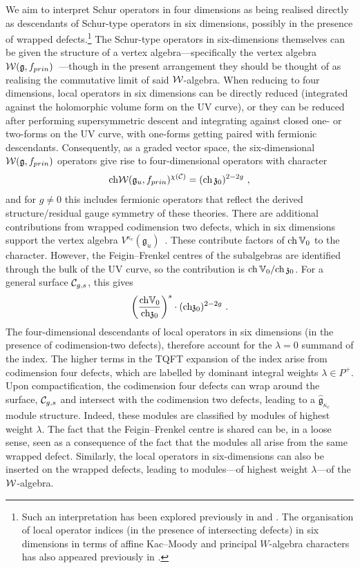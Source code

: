 \documentclass[a4paper]{article}
\def\IV{\mathbb{V}}
\def\CC{{\cal C}}
\def\WW{{\cal W}}
\def\ch{{\rm ch}}
\def\gf{\mathfrak{g}}
\def \zf{\mathfrak{z}}
\begin{document}
We aim to interpret Schur operators in four dimensions as being realised directly as descendants of Schur-type operators in six dimensions, possibly in the presence of wrapped defects.\footnote{Such an interpretation has been explored previously in \cite{gaioul} and \cite{BRZ}. The organisation of local operator indices (in the presence of intersecting defects) in six dimensions in terms of affine Kac--Moody and principal $W$-algebra characters has also appeared previously in \cite{Bullimore:2014upa}.} The Schur-type operators in six-dimensions themselves can be given the structure of a vertex algebra---specifically the vertex algebra $\WW(\gf,f_{prin})$~\cite{Beem:2014kka}---though in the present arrangement they should be thought of as realising the commutative limit of said $\WW$-algebra. When reducing to four dimensions, local operators in six dimensions can be directly reduced (integrated against the holomorphic volume form on the UV curve), or they can be reduced after performing supersymmetric descent and integrating against closed one- or two-forms on the UV curve, with one-forms getting paired with fermionic descendants. Consequently, as a graded vector space, the six-dimensional $\WW(\gf, f_{prin})$ operators give rise to four-dimensional operators with character
\begin{equation}
	\ch\WW(\gf_u,f_{prin})^{\chi(\CC)} = (\ch\, \zf_0)^{2-2g}~,
\end{equation}
and for $g\neq0$ this includes fermionic operators that reflect the derived structure/residual gauge symmetry of these theories. There are additional contributions from wrapped codimension two defects, which in six dimensions support the vertex algebra $V^{\kappa_c}(\gf_u)$~\cite{Beem:2014kka}. These contribute factors of $\ch\, \IV_0$ to the character. However, the Feigin--Frenkel centres of the subalgebras are identified through the bulk of the UV curve, so the contribution is $\ch\, \IV_0/\ch\,\zf_0$. For a general surface $\CC_{g,s}$, this gives
\begin{equation}
	 \left(\frac{\ch \IV_0}{\ch \zf_0}\right)^{s}\cdot (\ch \zf_0)^{2-2g}~.
\end{equation}
The four-dimensional descendants of local operators in six dimensions (in the presence of codimension-two defects), therefore account for the $\lambda=0$ summand of the index. The higher terms in the TQFT expansion of the index arise from codimension four defects, which are labelled by dominant integral weights $\lambda\in P^+$. Upon compactification, the codimension four defects can wrap around the surface, $\CC_{g,s}$ and intersect with the codimension two defects, leading to a $\hat{\gf}_{\kappa_c}$ module structure. Indeed, these modules are classified by modules of highest weight $\lambda$. The fact that the Feigin--Frenkel centre is shared can be, in a loose sense, seen as a consequence of the fact that the modules all arise from the same wrapped defect. Similarly, the local operators in six-dimensions can also be inserted on the wrapped defects, leading to modules---of highest weight $\lambda$---of the $\WW$-algebra.
\end{document}
